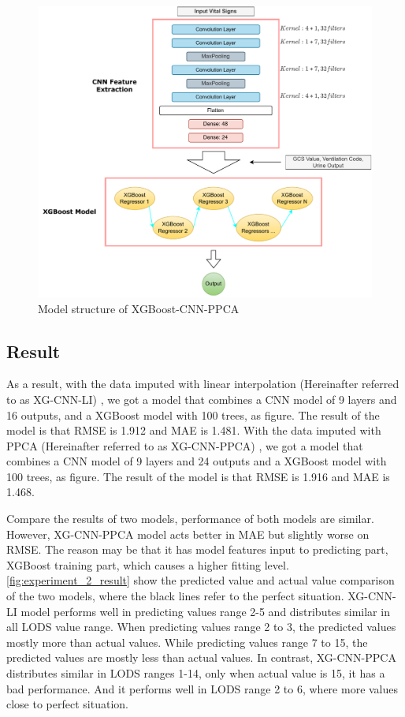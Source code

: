 \documentclass[12pt,a4paper,english
]{tunithesis}
\begin{document}
\begin{figure}
  \begin{center}
    \includegraphics[width=1\textwidth]{thesis/img/xg_cnn_ppca.pdf}
  \end{center}
  \caption[XGBoost-CNN-PPCA model]{Model structure of XGBoost-CNN-PPCA}
  \label{fig:xg_cnn_ppca_struc}
\end{figure}

\subsection{Result}
As a result, with the data imputed with linear interpolation (Hereinafter referred to as XG-CNN-LI) , we got a model that combines a CNN model of 9 layers and 16 outputs, and a XGBoost model with 100 trees, as figure. The result of the model is that RMSE is 1.912 and MAE is 1.481. With the data imputed with PPCA (Hereinafter referred to as XG-CNN-PPCA) , we got a model that combines a CNN model of 9 layers and 24 outputs and a XGBoost model with 100 trees, as figure. The result of the model is that RMSE is 1.916 and MAE is 1.468.

Compare the results of two models, performance of both models are similar. However, XG-CNN-PPCA model acts better in MAE but slightly worse on RMSE. The reason may be that it has model features input to predicting part, XGBoost training part, which causes a higher fitting level. \ref{fig:experiment_2_result} show the predicted value and actual value comparison of the two models, where the black lines refer to the perfect situation. XG-CNN-LI model performs well in predicting values range 2-5 and distributes similar in all LODS value range. When predicting values range 2 to 3, the predicted values mostly more than actual values. While predicting values range 7 to 15, the predicted values are mostly less than actual values. In contrast, XG-CNN-PPCA distributes similar in LODS ranges 1-14, only when actual value is 15, it has a bad performance. And it performs well in LODS range 2 to 6, where more values close to perfect situation.
\end{document}
